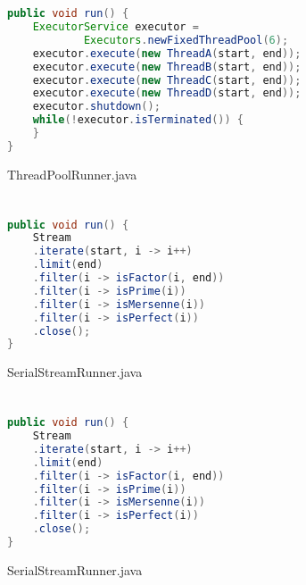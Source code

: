 \documentclass[]{report}
\begin{document}
\chapter{}
\begin{figure}[h!]
	\caption{ThreadPoolRunner.java}
	\begin{lstlisting}[language=Java,frame=single]
public void run() {
	ExecutorService executor =
			Executors.newFixedThreadPool(6);
	executor.execute(new ThreadA(start, end));
	executor.execute(new ThreadB(start, end));
	executor.execute(new ThreadC(start, end));
	executor.execute(new ThreadD(start, end));
	executor.shutdown();
	while(!executor.isTerminated()) {
	}
}
	\end{lstlisting}
\end{figure}

\chapter{}
\begin{figure}[h!]
	\caption{SerialStreamRunner.java}
	\begin{lstlisting}[language=Java,frame=single]
public void run() {
	Stream
	.iterate(start, i -> i++)
	.limit(end)
	.filter(i -> isFactor(i, end))
	.filter(i -> isPrime(i))
	.filter(i -> isMersenne(i))
	.filter(i -> isPerfect(i))
	.close();
}
	\end{lstlisting}
\end{figure}
\chapter{}
\begin{figure}[h!]
	\caption{SerialStreamRunner.java}
	\begin{lstlisting}[language=Java,frame=single]
public void run() {
    Stream
    .iterate(start, i -> i++)
    .limit(end)
    .filter(i -> isFactor(i, end))
    .filter(i -> isPrime(i))
    .filter(i -> isMersenne(i))
    .filter(i -> isPerfect(i))
    .close();
}
	\end{lstlisting}
\end{figure}
\end{document}
